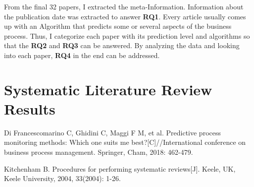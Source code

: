 \documentclass[runningheads]{llncs}
\begin{document}
		From the final 32 papers, I extracted the meta-Information. Information about the publication date was extracted to answer \textbf{RQ1}. Every article usually comes up with an Algorithm that predicts some or several aspects of the business process. Thus, I categorize each paper with its prediction level and algorithms so that the \textbf{RQ2} and \textbf{RQ3} can be answered. By analyzing the data and looking into each paper, \textbf{RQ4} in the end can be addressed.
		
	\section{Systematic Literature Review Results}





		
	\newpage
	\begin{thebibliography}{99}
	
	Di Francescomarino C, Ghidini C, Maggi F M, et al. Predictive process monitoring methods: Which one suits me best?[C]//International conference on business process management. Springer, Cham, 2018: 462-479.
	
	Kitchenham B. Procedures for performing systematic reviews[J]. Keele, UK, Keele University, 2004, 33(2004): 1-26.
		
	\end{thebibliography}

	
\end{document}
